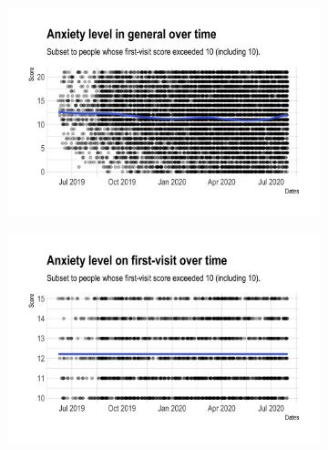 \documentclass[11pt]{article}
\begin{document}
\begin{figure}[htb!]
	\caption{Time trends}\label{fig:picture8}
	\begin{subfigure}[h]{0.48\linewidth}
		\includegraphics[width=\linewidth]{Figures/ppp5.png}
		\caption{}\label{fig:ppp5}
	\end{subfigure}
	\hfill
	\begin{subfigure}[h]{0.48\linewidth}
		\includegraphics[width=\linewidth]{Figures/ppp6.png}
		\caption{}\label{fig:ppp6}
	\end{subfigure}
\end{figure}

	
\clearpage 
\end{document}

